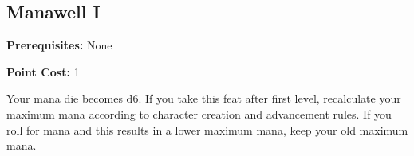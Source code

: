 \subsection{Manawell I}\label{feat:manawell1}

\noindent
\textbf{Prerequisites:} None

\noindent
\textbf{Point Cost:} 1 

Your mana die becomes d6. If you take this feat after first level, recalculate
your maximum mana according to character creation and advancement rules. If you
roll for mana and this results in a lower maximum mana, keep your old maximum
mana.
